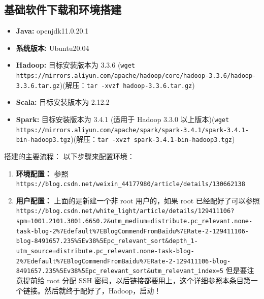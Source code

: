 \documentclass{article}
\begin{document}
\subsection*{基础软件下载和环境搭建}
\begin{itemize}
    \item \textbf{Java:} openjdk11.0.20.1
    \item \textbf{系统版本:} Ubuntu20.04
    \item \textbf{Hadoop:} 目标安装版本为 3.3.6 (\verb|wget https://mirrors.aliyun.com/apache/hadoop/core/hadoop-3.3.6/hadoop-3.3.6.tar.gz|)(解压：\verb|tar -xvzf hadoop-3.3.6.tar.gz|)
    \item \textbf{Scala:} 目标安装版本为 2.12.2 
    \item \textbf{Spark:} 目标安装版本为 3.4.1 (适用于 Hadoop 3.3.0 以上版本)(\verb|wget https://mirrors.aliyun.com/apache/spark/spark-3.4.1/spark-3.4.1-bin-hadoop3.tgz|)(解压：\verb|tar -xvzf spark-3.4.1-bin-hadoop3.tgz|)
\end{itemize}

搭建的主要流程：
以下步骤来配置环境：
\begin{enumerate}
    \item \textbf{环境配置：} 参照 \verb|https://blog.csdn.net/weixin_44177980/article/details/130662138|
    \item \textbf{用户配置：} 上面的是新建一个非 root 用户的，如果 root 已经配好了可以参照 \verb|https://blog.csdn.net/white_light/article/details/129411106?spm=1001.2101.3001.6650.2&utm_medium=distribute.pc_relevant.none-task-blog-2%7Edefault%7EBlogCommendFromBaidu%7ERate-2-129411106-blog-8491657.235%5Ev38%5Epc_relevant_sort&depth_1-utm_source=distribute.pc_relevant.none-task-blog-2%7Edefault%7EBlogCommendFromBaidu%7ERate-2-129411106-blog-8491657.235%5Ev38%5Epc_relevant_sort&utm_relevant_index=5| 但是要注意提前给 root 分配 SSH 密码，以后链接都要用上，这个详细参照本条目第一个链接。然后就终于配好了，Hadoop，启动！
\end{enumerate}
\end{document}
